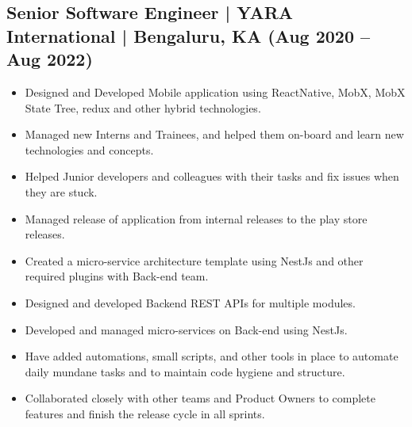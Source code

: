 \documentclass[10pt,a4paper]{article}
\begin{document}
\subsection*{Senior Software Engineer | YARA International | Bengaluru, KA (Aug 2020 -- Aug 2022)}
\begin{itemize}[leftmargin=*]
  \item Designed and Developed Mobile application using ReactNative, MobX, MobX State Tree, redux and other hybrid technologies.
  \item Managed new Interns and Trainees, and helped them on-board and learn new technologies and concepts.
  \item Helped Junior developers and colleagues with their tasks and fix issues when they are stuck.
  \item Managed release of application from internal releases to the play store releases.
  \item Created a micro-service architecture template using NestJs and other required plugins with Back-end team.
  \item Designed and developed Backend REST APIs for multiple modules.
  \item Developed and managed micro-services on Back-end using NestJs.
  \item Have added automations, small scripts, and other tools in place to automate daily mundane tasks and to maintain code hygiene and structure.
  \item Collaborated closely with other teams and Product Owners to complete features and finish the release cycle in all sprints.
\end{itemize}
\end{document}
